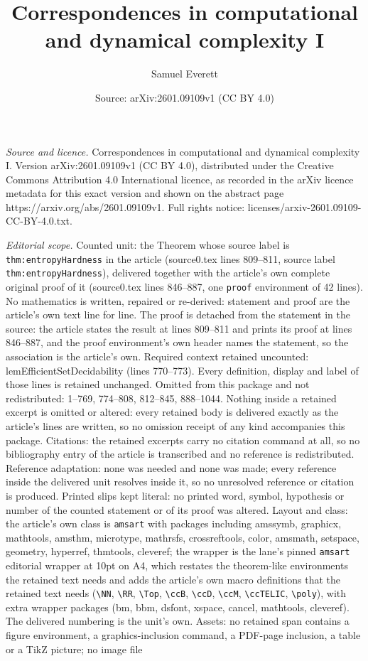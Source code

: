 \documentclass[10pt,a4paper]{amsart}
\title[Correspondences in computational and dynamical complexity I]{Correspondences in computational and dynamical complexity I}
\author{Samuel Everett}
\date{Source: arXiv:2601.09109v1 (CC BY 4.0)}
\begin{document}
\maketitle

\noindent\emph{Source and licence.} Correspondences in computational and dynamical complexity I. Version arXiv:2601.09109v1 (CC BY 4.0), distributed under the Creative Commons Attribution 4.0 International licence, as recorded in the arXiv licence metadata for this exact version and shown on the abstract page https://arxiv.org/abs/2601.09109v1. Full rights notice: licenses/arxiv-2601.09109-CC-BY-4.0.txt.\par\smallskip

\noindent\textit{Editorial scope.} Counted unit: the Theorem whose source label is \texttt{thm:entropyHardness} in the article (source0.tex lines 809--811, source label \texttt{thm:entropyHardness}), delivered together with the article's own complete original proof of it (source0.tex lines 846--887, one \texttt{proof} environment of 42 lines). No mathematics is written, repaired or re-derived: statement and proof are the article's own text line for line. The proof is detached from the statement in the source: the article states the result at lines 809--811 and prints its proof at lines 846--887, and the proof environment's own header names the statement, so the association is the article's own. Required context retained uncounted: lemEfficientSetDecidability (lines 770--773). Every definition, display and label of those lines is retained unchanged. Omitted from this package and not redistributed: 1--769, 774--808, 812--845, 888--1044. Nothing inside a retained excerpt is omitted or altered: every retained body is delivered exactly as the article's lines are written, so no omission receipt of any kind accompanies this package. Citations: the retained excerpts carry no citation command at all, so no bibliography entry of the article is transcribed and no reference is redistributed. Reference adaptation: none was needed and none was made; every reference inside the delivered unit resolves inside it, so no unresolved reference or citation is produced. Printed slips kept literal: no printed word, symbol, hypothesis or number of the counted statement or of its proof was altered. Layout and class: the article's own class is \texttt{amsart} with packages including amssymb, graphicx, mathtools, amsthm, microtype, mathrsfs, crossreftools, color, amsmath, setspace, geometry, hyperref, thmtools, cleveref; the wrapper is the lane's pinned \texttt{amsart} editorial wrapper at 10pt on A4, which restates the theorem-like environments the retained text needs and adds the article's own macro definitions that the retained text needs (\texttt{\textbackslash NN}, \texttt{\textbackslash RR}, \texttt{\textbackslash Top}, \texttt{\textbackslash ccB}, \texttt{\textbackslash ccD}, \texttt{\textbackslash ccM}, \texttt{\textbackslash ccTELIC}, \texttt{\textbackslash poly}), with extra wrapper packages (bm, bbm, dsfont, xspace, cancel, mathtools, cleveref). The delivered numbering is the unit's own. Assets: no retained span contains a figure environment, a graphics-inclusion command, a PDF-page inclusion, a table or a TikZ picture; no image file 
\end{document}
